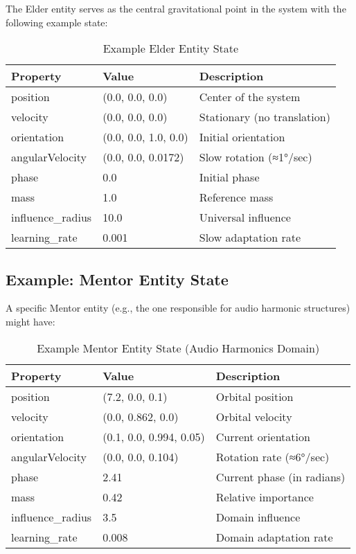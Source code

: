 The Elder entity serves as the central gravitational point in the system with the following example state:

\begin{table}[h]
\centering
\begin{tabular}{|l|l|l|}
\hline
\textbf{Property} & \textbf{Value} & \textbf{Description} \\
\hline
position & (0.0, 0.0, 0.0) & Center of the system \\
velocity & (0.0, 0.0, 0.0) & Stationary (no translation) \\
orientation & (0.0, 0.0, 1.0, 0.0) & Initial orientation \\
angularVelocity & (0.0, 0.0, 0.0172) & Slow rotation (≈1°/sec) \\
phase & 0.0 & Initial phase \\
mass & 1.0 & Reference mass \\
influence\_radius & 10.0 & Universal influence \\
learning\_rate & 0.001 & Slow adaptation rate \\
\hline
\end{tabular}
\caption{Example Elder Entity State}
\end{table}

\subsection{Example: Mentor Entity State}

A specific Mentor entity (e.g., the one responsible for audio harmonic structures) might have:

\begin{table}[h]
\centering
\begin{tabular}{|l|l|l|}
\hline
\textbf{Property} & \textbf{Value} & \textbf{Description} \\
\hline
position & (7.2, 0.0, 0.1) & Orbital position \\
velocity & (0.0, 0.862, 0.0) & Orbital velocity \\
orientation & (0.1, 0.0, 0.994, 0.05) & Current orientation \\
angularVelocity & (0.0, 0.0, 0.104) & Rotation rate (≈6°/sec) \\
phase & 2.41 & Current phase (in radians) \\
mass & 0.42 & Relative importance \\
influence\_radius & 3.5 & Domain influence \\
learning\_rate & 0.008 & Domain adaptation rate \\
\hline
\end{tabular}
\caption{Example Mentor Entity State (Audio Harmonics Domain)}
\end{table}

